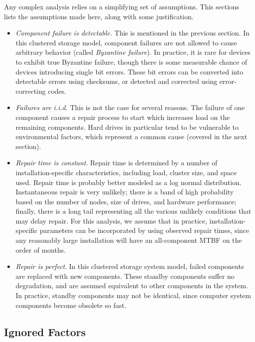 \documentclass[11pt]{article}
\numberwithin{equation}{section}
\begin{document}
Any complex analysis relies on a simplifying set of assumptions.  This
sections lists the assumptions made here, along with some justification.

\begin{itemize}
  \item {\em Component failure is detectable.}  
  This is mentioned in the previous section.  In this clustered storage model,
  component failures are not allowed to cause arbitrary behavior (called {\em
  Byzantine failure}).  In practice, it is rare for devices to exhibit true
  Byzantine failure, though there is some measurable chance of devices
  introducing single bit errors.  These bit errors can be converted into
  detectable errors using checksums, or detected and corrected using
  error-correcting codes.

  \item {\em Failures are i.i.d.} 
  This is not the case for several reasons.  The failure of one component
  causes a repair process to start which increases load on the remaining
  components.  Hard drives in particular tend to be vulnerable to
  environmental factors, which represent a common cause (covered in the next
  section).

  \item {\em Repair time is constant}.  
  Repair time is determined by a number of installation-specific
  characteristics, including load, cluster size, and space used.  Repair time
  is probably better modeled as a log normal distribution.  Instantaneous
  repair is very unlikely; there is a band of high probability based on the
  number of nodes, size of drives, and hardware performance; finally, there is
  a long tail representing all the various unlikely conditions that may delay
  repair.  For this analysis, we assume that in practice,
  installation-specific parameters can be incorporated by using observed repair
  times, since any reasonably large installation will have an all-component
  MTBF on the order of months.

  \item {\em Repair is perfect}.  
  In this clustered storage system model, failed components are replaced with
  new components.  These standby components suffer no degradation, and are
  assumed equivalent to other components in the system.  In practice, standby
  components may not be identical, since computer system components become
  obsolete so fast.
\end{itemize}

\subsection{Ignored Factors}
\end{document}
